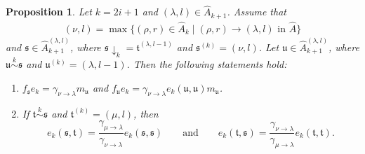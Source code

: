 \documentclass[11pt,a4paper,reqno,svgnames]{amsart}
\theoremstyle{plain}
\newtheorem{proposition}[theorem]{Proposition}
\theoremstyle{definition}
\numberwithin{equation}{section}
\begin{document}
\begin{proposition}\label{offdiag:2}
Let $k=2i+1$ and $(\lambda,l)\in\hat{A}_{k+1}$. Assume that 
\begin{align*}
(\nu,l)=\max\lbrace(\rho,r)\in\hat{A}_k\mid(\rho,r)\to(\lambda,l)\text{ in }\hat{A}\rbrace
\end{align*}
and  $\mathfrak{s}\in\hat{A}_{k+1}^{(\lambda,l)}$, where $\mathfrak{s}\downarrow_{k}=\mathfrak{t}^{(\lambda,l-1)}$ and $\mathfrak{s}^{(k)}=(\nu,l)$. Let $\mathfrak{u}\in\hat{A}_{k+1}^{(\lambda,l)}$, where $\mathfrak{u}\stackrel{k}{\sim}\mathfrak{s}$ and $\mathfrak{u}^{(k)}=(\lambda,l-1)$. Then the following statements hold:
\begin{enumerate}[label=(\arabic{*}), ref=\arabic{*},leftmargin=0pt,itemindent=1.5em]
\item\label{offdiag:2.1} $f_\mathfrak{s}e_k=\gamma_{\nu\to\lambda}m_\mathfrak{u}$ and $f_\mathfrak{u}e_k=\gamma_{\nu\to\lambda}e_k(\mathfrak{u,u})m_\mathfrak{u}$. 
\item\label{offdiag:2.2} If $\mathfrak{t}\stackrel{k}{\sim}\mathfrak{s}$ and $\mathfrak{t}^{(k)}=(\mu,l)$, then 
\[
e_k(\mathfrak{s,t})=\frac{\gamma_{\mu\to\lambda}}{\gamma_{\nu\to\lambda}}e_k( \mathfrak{s,s})\qquad \text{and}\qquad e_k(\mathfrak{t,s})=\frac{\gamma_{\nu\to\lambda}}{\gamma_{\mu\to\lambda}}e_k(\mathfrak{t,t}). 
\]
\end{enumerate}
\end{proposition}
\end{document}
